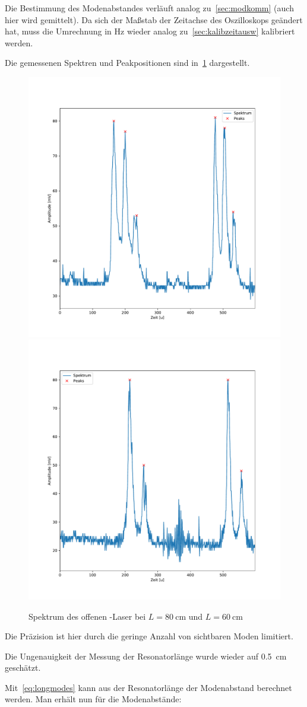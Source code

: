 \documentclass[slug=GL, room=HZDR\ Dresden/Rossendorf\,\ Geb.\ 620/123, supervisor=Tim\ Ziegler]{../../Lab_Report_LaTeX/lab_report}
\newcommand{\hne}{\ce{HeNe}-Laser}
\begin{document}
Die Bestimmung des Modenabstandes verl\"auft analog
zu~\ref{sec:modkomm} (auch hier wird gemittelt).  Da sich der Maßstab
der Zeitachse des Oszilloskops ge\"andert hat, muss die Umrechnung in
\si{\hertz} wieder analog zu~\ref{sec:kalibzeitausw} kalibriert
werden.

Die gemessenen Spektren und Peakpositionen sind in~\ref{fig:off_80_60} dargestellt.
\begin{figure}[b]\centering
  \includegraphics[width=.5\columnwidth]{figs/off_80.pdf}
  \includegraphics[width=.5\columnwidth]{figs/off_60.pdf}

  \caption{Spektrum des offenen \hne{} bei \(L=\SI{80}{\centi\meter}\)
  und \(L=\SI{60}{\centi\meter}\)}
  \label{fig:off_80_60}
\end{figure}

Die Pr\"azision ist hier durch die geringe Anzahl von sichtbaren Moden
limitiert.

Die Ungenauigkeit der Messung der Resonatorl\"ange wurde wieder auf
\SI{.5}{\centi\meter} gesch\"atzt.

Mit~\ref{eq:longmodes} kann aus der Resonatorl\"ange der Modenabstand berechnet
werden. Man erh\"alt nun f\"ur die Modenabst\"ande:
\end{document}
